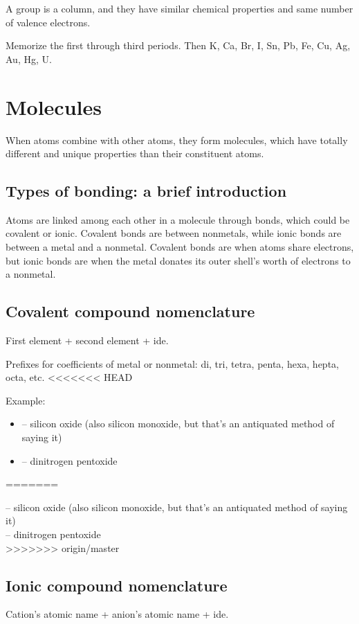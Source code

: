 \documentclass[letterpaper, 12pt]{article}
\begin{document}
A group is a column, and they have similar chemical properties and same number of valence electrons.

Memorize the first through third periods. Then K, Ca, Br, I, Sn, Pb, Fe, Cu, Ag, Au, Hg, U.

\section{Molecules}
When atoms combine with other atoms, they form molecules, which have totally different and unique properties than their constituent atoms.

	\subsection{Types of bonding: a brief introduction}
	Atoms are linked among each other in a molecule through bonds, which could be covalent or ionic. Covalent bonds are between nonmetals, while ionic bonds are between a metal and a nonmetal. Covalent bonds are when atoms share electrons, but ionic bonds are when the metal donates its outer shell's worth of electrons to a nonmetal.

	\subsection{Covalent compound nomenclature}
	First element + second element + ide.

	Prefixes for coefficients of metal or nonmetal: di, tri, tetra, penta, hexa, hepta, octa, etc.
<<<<<<< HEAD
	
	Example:
	
	\begin{itemize}
		\item {} -- silicon oxide (also silicon monoxide, but that's an antiquated method of saying it)
		\item {} -- dinitrogen pentoxide
	\end{itemize}
	
=======

	 -- silicon oxide (also silicon monoxide, but that's an antiquated method of saying it)\\
	 -- dinitrogen pentoxide\\

>>>>>>> origin/master
	\subsection{Ionic compound nomenclature}
	Cation's atomic name + anion's atomic name + ide.
\end{document}
